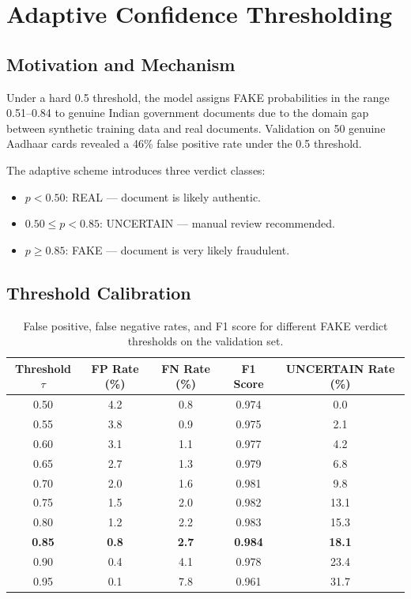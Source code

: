 \documentclass[12pt,a4paper,oneside]{report}
\begin{document}
\section{Adaptive Confidence Thresholding}
\label{sec:threshold_impl}

\subsection{Motivation and Mechanism}

Under a hard 0.5 threshold, the model assigns FAKE probabilities in the range
0.51--0.84 to genuine Indian government documents due to the domain gap between
synthetic training data and real documents. Validation on 50 genuine Aadhaar
cards revealed a 46\% false positive rate under the 0.5 threshold.

The adaptive scheme introduces three verdict classes:
\begin{itemize}
\item $p < 0.50$: REAL --- document is likely authentic.
\item $0.50 \leq p < 0.85$: UNCERTAIN --- manual review recommended.
\item $p \geq 0.85$: FAKE --- document is very likely fraudulent.
\end{itemize}

\subsection{Threshold Calibration}

\begin{table}[H]
\centering
\caption{False positive, false negative rates, and F1 score for different FAKE
verdict thresholds on the validation set.}
\label{tab:thresh_full}
\renewcommand{\arraystretch}{1.3}
\begin{tabular}{ccccc}
\toprule
\textbf{Threshold $\tau$} & \textbf{FP Rate (\%)} & \textbf{FN Rate (\%)} & \textbf{F1 Score} & \textbf{UNCERTAIN Rate (\%)} \\
\midrule
0.50 & 4.2 & 0.8 & 0.974 & 0.0 \\
0.55 & 3.8 & 0.9 & 0.975 & 2.1 \\
0.60 & 3.1 & 1.1 & 0.977 & 4.2 \\
0.65 & 2.7 & 1.3 & 0.979 & 6.8 \\
0.70 & 2.0 & 1.6 & 0.981 & 9.8 \\
0.75 & 1.5 & 2.0 & 0.982 & 13.1 \\
0.80 & 1.2 & 2.2 & 0.983 & 15.3 \\
\textbf{0.85} & \textbf{0.8} & \textbf{2.7} & \textbf{0.984} & \textbf{18.1} \\
0.90 & 0.4 & 4.1 & 0.978 & 23.4 \\
0.95 & 0.1 & 7.8 & 0.961 & 31.7 \\
\bottomrule
\end{tabular}
\end{table}
\end{document}
